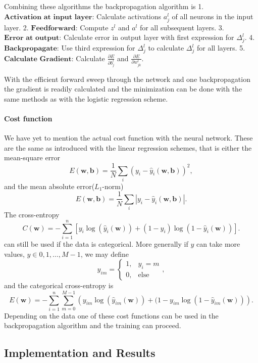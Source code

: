 \documentclass[11pt]{article}
\begin{document}
Combining these algorithms the backpropagation algorithm is 1.
\(\textbf{Activation at input layer}\): Calculate activations \(a^l_j\)
of all neurons in the input layer. 2. \(\textbf{Feedforward}\): Compute
\(z^l\) and \(a^l\) for all subsequent layers. 3.
\(\textbf{Error at output}\): Calculate error in output layer with first
expression for \(\Delta^l_j\). 4. \(\textbf{Backpropagate}\): Use third
expression for \(\Delta^l_j\) to calculate \(\Delta^l_j\) for all
layers. 5. \(\textbf{Calculate Gradient}\): Calculate
\(\frac{\partial E}{\partial b^l_j}\) and
\(\frac{\partial E}{\partial w^l_{jk}}\).

With the efficient forward sweep through the network and one
backpropagation the gradient is readily calculated and the minimization
can be done with the same methods as with the logistic regression
scheme.

\hypertarget{cost-function}{%
\paragraph{Cost function}\label{cost-function}}

We have yet to mention the actual cost function with the neural network.
These are the same as introduced with the linear regression schemes,
that is either the mean-square error
\[E(\boldsymbol{w},\boldsymbol{b}) = \frac{1}{N}\sum_i\left(y_i - \hat{y}_i(\boldsymbol{w},\boldsymbol{b})\right)^2,\]
and the mean absolute error(\(L_1\)-norm)
\[E(\boldsymbol{w},\boldsymbol{b}) = \frac{1}{N}\sum_i\left|y_i - \hat{y}_i(\boldsymbol{w},\boldsymbol{b})\right|.\]
The cross-entropy
\[C(\boldsymbol{w}) = -\sum\limits_{i=1}^n \left[y_i\log\left(\hat{y}_i(\boldsymbol{w})\right) + (1 - y_i)\log\left(1 - \hat{y}_i(\boldsymbol{w})\right)\right].\]
can still be used if the data is categorical. More generally if \(y\)
can take more values, \(y\in{0,1,\dots,M-1}\), we may define
\[y_{im} = \left\{\begin{matrix}
        1,& y_i = m \\
        0,& \text{else}
    \end{matrix}\right.,\] and the categorical cross-entropy is
\[E(\boldsymbol{w}) = -\sum_{i=1}^n \sum_{m=0}^{M-1}\left(y_{im} \log\left(\hat{y}_{im}(\boldsymbol{w})\right) + (1 - y_{im} \log\left(1 - \hat{y}_{im}(\boldsymbol{w})\right)\right).\]
Depending on the data one of these cost functions can be used in the
backpropagation algorithm and the training can proceed.

    \hypertarget{implementation-and-results}{%
\subsection{Implementation and
Results}\label{implementation-and-results}}
\end{document}
